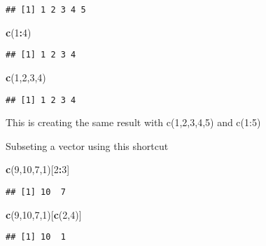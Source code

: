 \documentclass[
]{article}
\newenvironment{Shaded}{\begin{snugshade}}{\end{snugshade}}
\newcommand{\DecValTok}[1]{\textcolor[rgb]{0.00,0.00,0.81}{#1}}
\newcommand{\KeywordTok}[1]{\textcolor[rgb]{0.13,0.29,0.53}{\textbf{#1}}}
\newcommand{\NormalTok}[1]{#1}
\newcommand{\OperatorTok}[1]{\textcolor[rgb]{0.81,0.36,0.00}{\textbf{#1}}}
\begin{document}
\begin{verbatim}
## [1] 1 2 3 4 5
\end{verbatim}

\begin{Shaded}
\begin{Highlighting}[]
\KeywordTok{c}\NormalTok{(}\DecValTok{1}\OperatorTok{:}\DecValTok{4}\NormalTok{)}
\end{Highlighting}
\end{Shaded}

\begin{verbatim}
## [1] 1 2 3 4
\end{verbatim}

\begin{Shaded}
\begin{Highlighting}[]
\KeywordTok{c}\NormalTok{(}\DecValTok{1}\NormalTok{,}\DecValTok{2}\NormalTok{,}\DecValTok{3}\NormalTok{,}\DecValTok{4}\NormalTok{)}
\end{Highlighting}
\end{Shaded}

\begin{verbatim}
## [1] 1 2 3 4
\end{verbatim}

This is creating the same result with c(1,2,3,4,5) and c(1:5)

Subseting a vector using this shortcut

\begin{Shaded}
\begin{Highlighting}[]
\KeywordTok{c}\NormalTok{(}\DecValTok{9}\NormalTok{,}\DecValTok{10}\NormalTok{,}\DecValTok{7}\NormalTok{,}\DecValTok{1}\NormalTok{)[}\DecValTok{2}\OperatorTok{:}\DecValTok{3}\NormalTok{]}
\end{Highlighting}
\end{Shaded}

\begin{verbatim}
## [1] 10  7
\end{verbatim}

\begin{Shaded}
\begin{Highlighting}[]
\KeywordTok{c}\NormalTok{(}\DecValTok{9}\NormalTok{,}\DecValTok{10}\NormalTok{,}\DecValTok{7}\NormalTok{,}\DecValTok{1}\NormalTok{)[}\KeywordTok{c}\NormalTok{(}\DecValTok{2}\NormalTok{,}\DecValTok{4}\NormalTok{)]}
\end{Highlighting}
\end{Shaded}

\begin{verbatim}
## [1] 10  1
\end{verbatim}
\end{document}
